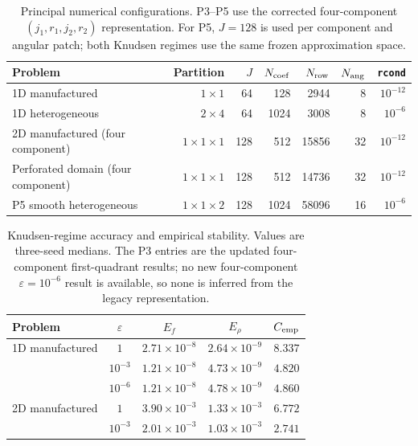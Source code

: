 \begin{table}[t]
\centering
\caption{Principal numerical configurations. P3--P5 use the corrected four-component $(j_1,r_1,j_2,r_2)$ representation. For P5, $J=128$ is used per component and angular patch; both Knudsen regimes use the same frozen approximation space.}
\label{tab:configurations}
\begin{tabular}{lrrrrrr}
\toprule
Problem & Partition & $J$ & $N_{\rm coef}$ & $N_{\rm row}$ & $N_{\rm ang}$ & \texttt{rcond}\\
\midrule
1D manufactured & $1\times1$ & 64 & 128 & 2944 & 8 & $10^{-12}$\\
1D heterogeneous & $2\times4$ & 64 & 1024 & 3008 & 8 & $10^{-6}$\\
2D manufactured (four component) & $1\times1\times1$ & 128 & 512 & 15856 & 32 & $10^{-12}$\\
Perforated domain (four component) & $1\times1\times1$ & 128 & 512 & 14736 & 32 & $10^{-12}$\\
P5 smooth heterogeneous & $1\times1\times2$ & 128 & 1024 & 58096 & 16 & $10^{-6}$\\
\bottomrule
\end{tabular}
\end{table}

\begin{table}[t]
\centering
\caption{Knudsen-regime accuracy and empirical stability. Values are three-seed medians. The P3 entries are the updated four-component first-quadrant results; no new four-component $\varepsilon=10^{-6}$ result is available, so none is inferred from the legacy representation.}
\label{tab:knudsen-accuracy}
\begin{tabular}{lcccc}
\toprule
Problem & $\varepsilon$ & $E_f$ & $E_\rho$ & $C_{\rm emp}$\\
\midrule
1D manufactured & $1$ & $2.71\times10^{-8}$ & $2.64\times10^{-9}$ & $8.337$\\
 & $10^{-3}$ & $1.21\times10^{-8}$ & $4.73\times10^{-9}$ & $4.820$\\
 & $10^{-6}$ & $1.21\times10^{-8}$ & $4.78\times10^{-9}$ & $4.860$\\
\midrule
2D manufactured & $1$ & $3.90\times10^{-3}$ & $1.33\times10^{-3}$ & $6.772$\\
 & $10^{-3}$ & $2.01\times10^{-3}$ & $1.03\times10^{-3}$ & $2.741$\\
\bottomrule
\end{tabular}
\end{table}

